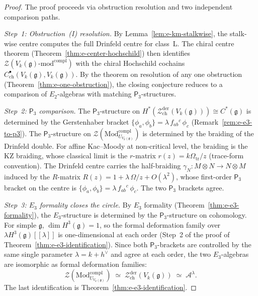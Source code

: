 \documentclass[11pt,reqno]{amsart}
\theoremstyle{definition}
\theoremstyle{remark}
\providecommand{\cA}{\mathcal{A}}
\providecommand{\cZ}{\mathcal{Z}}
\providecommand{\fg}{\mathfrak{g}}
\providecommand{\Etwo}{E_2}
\providecommand{\Ethree}{E_3}
\providecommand{\Pthree}{\mathsf{P}_3}
\begin{document}
\begin{proof}
The proof proceeds via obstruction resolution and two
independent comparison paths.

\emph{Step~1: Obstruction~(I) resolution.}
By Lemma~\ref{lem:e-km-stalkwise}, the stalk-wise
centre computes the full Drinfeld centre for class~L.
The chiral centre theorem
(Theorem~\ref{thm:e-center-hochschild}) then identifies
\(\mathcal Z(V_k(\fg)\text{-mod}^{\mathrm{compl}})\) with the chiral Hochschild
cochains $C^\bullet_{\mathrm{ch}}(V_k(\fg), V_k(\fg))$.
By the theorem on resolution of any one obstruction
(Theorem~\ref{thm:e-one-obstruction}), the closing
conjecture reduces to a comparison of $\Etwo$-algebras
with matching $\Pthree$-structures.

\emph{Step~2: $\Pthree$ comparison.}
The $\Pthree$-structure on
$H^*(\cZ^{\mathrm{der}}_{\mathrm{ch}}(V_k(\fg)))
\cong C^*(\fg)$ is determined by the Gerstenhaber
bracket $\{\phi_a, \phi_b\} = \lambda\,f_{ab}{}^c\,\phi_c$
(Remark~\ref{rem:e-e3-to-p3}). The $\Pthree$-structure
on \(\mathcal Z(\mathrm{Mod}^{\mathrm{compl}}_{U_{V_k(\fg)}})\) is
determined by the braiding of
the Drinfeld double. For affine Kac--Moody at non-critical
level, the braiding is the KZ braiding, whose classical
limit is the $r$-matrix
$r(z) = k\Omega_{\mathrm{tr}}/z$ (trace-form convention).
The Drinfeld centre
carries the half-braiding
$\gamma_N \colon M \otimes N \to N \otimes M$ induced by
the $R$-matrix $R(z) = 1 + \lambda\,\Omega/z + O(\lambda^2)$,
whose first-order $\Pthree$ bracket on the centre
is $\{\phi_a, \phi_b\} = \lambda\,f_{ab}{}^c\,\phi_c$.
The two $\Pthree$ brackets agree.

\emph{Step~3: $\Ethree$ formality closes the circle.}
By $\Ethree$ formality
(Theorem~\ref{thm:e-e3-formality}), the $\Ethree$-structure
is determined by the $\Pthree$-structure on cohomology. For
simple $\fg$, $\dim H^3(\fg) = 1$, so the formal deformation
family over $\lambda H^3(\fg)[[\lambda]]$ is one-dimensional
at each order (Step~2 of the proof of
Theorem~\ref{thm:e-e3-identification}). Since both
$\Pthree$-brackets are controlled by the same single
parameter $\lambda = k + h^\vee$ and agree at each order,
the two $\Ethree$-algebras are isomorphic as formal
deformation families:
\[
\mathcal Z(\mathrm{Mod}^{\mathrm{compl}}_{U_{V_k(\fg)}})
\;\simeq\;
\cZ^{\mathrm{der}}_{\mathrm{ch}}(V_k(\fg))
\;\simeq\;
\cA^\lambda.
\]
The last identification is
Theorem~\ref{thm:e-e3-identification}.
\end{proof}
\end{document}
